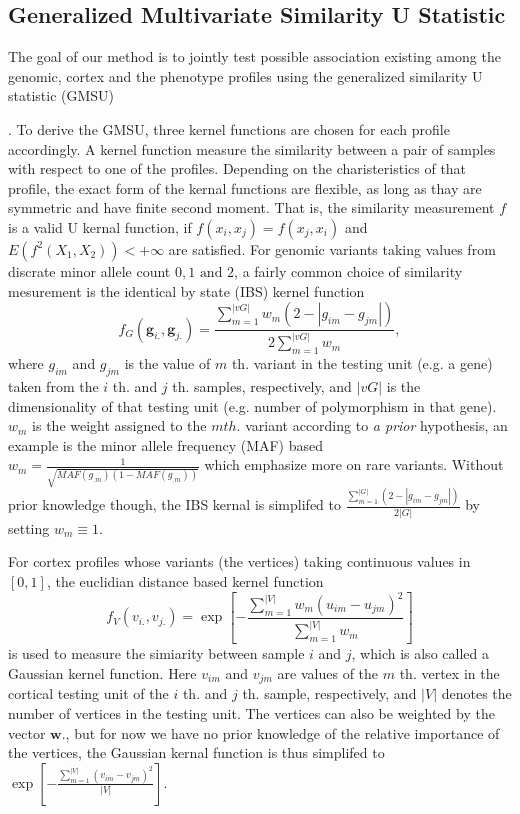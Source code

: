 \subsection{Generalized Multivariate Similarity U Statistic}
The goal of our method is to jointly test possible association existing among the genomic, cortex and the phenotype profiles using the generalized similarity U statistic (GMSU) {\cite{UST1, UST2}. To derive the GMSU, three kernel functions are chosen for each profile accordingly. A kernel function measure the similarity between a pair of samples with respect to one of the profiles. Depending on the charisteristics of that profile, the exact form of the kernal functions are flexible, as long as thay are symmetric and have finite second moment. That is, the similarity measurement $f$ is a valid U kernal function, if $f(x_i,x_j)=f(x_j,x_i)$ and $E(f^2(X_1, X_2))<+\infty$ are satisfied.
\newcommand{\vg}{\boldsymbol{g}}
\newcommand{\vv}{\boldsymbol{v}}
\newcommand{\vy}{\boldsymbol{y}}
\newcommand{\vG}{\boldsymbol{G}}
\newcommand{\vV}{\boldsymbol{V}}
\newcommand{\vY}{\boldsymbol{Y}}
\newcommand{\vq}{\boldsymbol{q}}
For genomic variants taking values from discrate minor allele count ${0, 1 \textrm{ and } 2}$, a fairly common choice of similarity mesurement is the identical by state (IBS) kernel function
\label{eq:wSG}
\[ f_G(\vg_{i.}, \vg_{j.}) = \frac{\sum_{m=1}^{|vG|}{w_m(2 - |g_{im} - g_{jm}|)}} {2\sum_{m=1}^{|vG|}{w_m}}, \]
where $g_{im}$ and $g_{jm}$ is the value of $m$ th. variant in the testing unit (e.g. a gene) taken from the $i$ th. and $j$ th. samples, respectively, and $|vG|$ is the dimensionality of that testing unit (e.g. number of polymorphism in that gene). $w_m$ is the weight assigned to the $m th.$ variant according to \textit{a prior} hypothesis, an example is the minor allele frequency (MAF) based $w_m=\frac{1}{\sqrt{MAF(g_{.m})(1-MAF(g_{.m}))}}$ which emphasize more on rare variants. Without prior knowledge though, the IBS kernal is simplifed to $\frac{\sum_{m = 1}^{|G|}{(2-|g_{im} - g_{jm}|)}}{2|G|}$ by setting $w_m \equiv 1$.

For cortex profiles whose variants (the vertices) taking continuous values in $[0,1]$, the euclidian distance based kernel function
\label{eq:wSV}
\[ f_V(v_{i.},v_{j.}) = \exp{ [-\frac{\sum_{m=1}^{|V|}{w_m(u_{im}-u_{jm})^2}} {\sum_{m=1}^{|V|}{w_m}}] } \]
is used to measure the simiarity between sample $i$ and $j$, which is also called a Gaussian kernel function. Here $v_{im}$ and $v_{jm}$ are values of the $m$ th. vertex in the cortical testing unit of the $i$ th. and $j$ th. sample, respectively, and $|V|$ denotes the number of vertices in the testing unit. The vertices can also be weighted by the vector $\boldsymbol{w}.$, but for now we have no prior knowledge of the relative importance of the vertices, the Gaussian kernal function is thus simplifed to $\exp{[-\frac{\sum_{m=1}^{|V|}{(v_{im}-v_{jm})^2}} {|V|}]}$.

}
